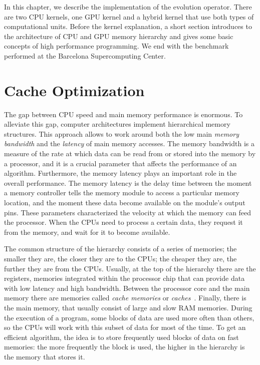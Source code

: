 In this chapter, we describe the implementation of the evolution operator. There are two CPU kernels, one GPU kernel and a hybrid kernel that use both types of computational units. Before the kernel explanation, a short section introduces to the architecture of CPU and GPU memory hierarchy and gives some basic concepts of high performance programming. We end with the benchmark performed at the Barcelona Supercomputing Center.

\section{Cache Optimization}
The gap between CPU speed and main memory performance is enormous. To alleviate this gap, computer architectures implement hierarchical memory structures. This approach allows to work around both the low main \textit{memory bandwidth} and the \textit{latency} of main memory accesses.
The memory bandwidth is a measure of the rate at which data can be read from or stored into the memory by a processor, and it is a crucial parameter that affects the performance of an algorithm. Furthermore, the memory latency plays an important role in the overall performance. The memory latency is the delay time between the moment a memory controller tells the memory module to access a particular memory location, and the moment these data become available on the module's output pins. These parameters characterized the velocity at which the memory can feed the processor. When the CPUs need to process a certain data, they request it from the memory, and wait for it to become available.
 
  The common structure of the hierarchy consists of a series of memories; the smaller they are, the closer they are to the CPUs; the cheaper they are, the further they are from the CPUs. Usually, at the top of the hierarchy there are the registers, memories integrated within the processor chip that can provide data with low latency and high bandwidth. Between the processor core and the main memory there are memories called \emph{cache memories} or \emph{caches}~\citep{Handy}. Finally, there is the main memory, that usually consist of large and slow RAM memories. During the execution of a program, some blocks of data are used more often than others, so the CPUs will work with this subset of data for most of the time. To get an efficient algorithm, the idea is to store frequently used blocks of data on fast memories: the more frequently the block is used, the higher in the hierarchy is the memory that stores it. 

